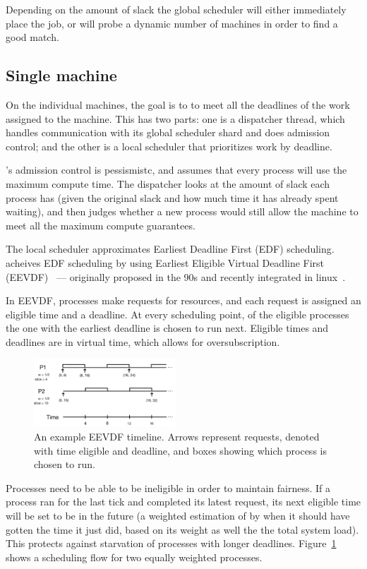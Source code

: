 Depending on the amount of slack the global scheduler will either immediately
place the job, or will probe a dynamic number of machines in order to find a
good match.


\subsection*{Single machine}

On the individual machines, the goal is to to meet all the deadlines of the work
assigned to the machine. This has two parts: one is a dispatcher thread, which
handles communication with its global scheduler shard and does admission
control; and the other is a local scheduler that prioritizes work by deadline.

\sysname{}'s admission control is pessismistc, and assumes that every process will use the
maximum compute time. The dispatcher looks at the amount of slack each process
has (given the original slack and how much time it has already spent waiting),
and then judges whether a new process would still allow the machine to meet all
the maximum compute guarantees.


The local scheduler approximates Earliest Deadline First (EDF) scheduling.
\sysname{} acheives EDF scheduling by using Earliest Eligible Virtual Deadline
First (EEVDF)~\cite{eevdf} --- originally proposed in the 90s and recently
integrated in linux~\cite{linuxeevdf}.

In EEVDF, processes make requests for resources, and each request is assigned an
eligible time and a deadline. At every scheduling point, of the eligible
processes the one with the earliest deadline is chosen to run next. Eligible
times and deadlines are in virtual time, which allows for oversubscription. 

\begin{figure}[t!]
    \centering
    \includegraphics[height=1in]{img/eevdf.png}
    \caption{An example EEVDF timeline. Arrows represent requests, denoted with
        time eligible and deadline, and boxes showing which process is chosen to
        run.}
    \label{fig:eevdf}
\end{figure}

Processes need to be able to be ineligible in order to maintain fairness. If a
process ran for the last tick and completed its latest request, its next
eligible time will be set to be in the future (a weighted estimation of by when
it should have gotten the time it just did, based on its weight as well the the
total system load). This protects against starvation of processes with longer
deadlines. Figure~\ref{fig:eevdf} shows a scheduling flow for two equally weighted
processes.

